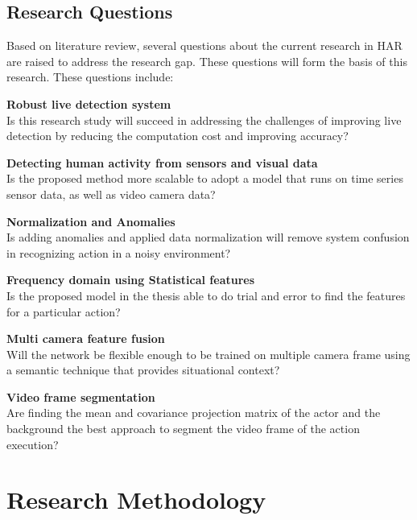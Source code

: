 \subsection{Research Questions}
\hspace{5mm} Based on literature review, several questions about the current research in HAR are raised to address the research gap. These questions will form the basis of this research. These questions include:\\
\begin{description}
    \item \textbf{Robust live detection system}\hfill \\
    Is this research study will succeed in addressing the challenges of improving live detection by reducing the computation cost and improving accuracy?
   
    \item \textbf{Detecting human activity from sensors and visual data}\hfill \\
    Is the proposed method more scalable to adopt a model that runs on time series sensor data, as well as video camera data? 

    \item \textbf{Normalization and Anomalies}\hfill \\
    Is adding anomalies and applied data normalization will remove system confusion in recognizing action in a noisy environment?
    
    \item \textbf{Frequency domain using Statistical features}\hfill \\
    Is the proposed model in the thesis able to do trial and error to find the features for a particular action?
    
    \item \textbf{Multi camera feature fusion} \hfill \\
    Will the network be flexible enough to be trained on multiple camera frame using a semantic technique that provides situational context?
    
    \item \textbf{Video frame segmentation}\hfill \\
    Are finding the mean and covariance projection matrix of the actor and the background the best approach to segment the video frame of the action execution?
    
\end{description}

\section{Research Methodology}
